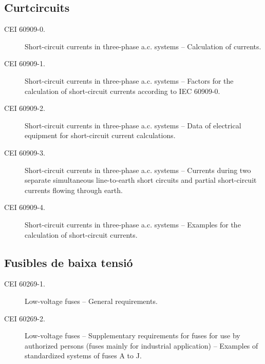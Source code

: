 \subsection*{Curtcircuits}
\begin{description}
    \item [\hspace{5mm}CEI 60909-0.] Short-circuit currents in three-phase a.c. systems -- Calculation of currents.
    \item [\hspace{5mm}CEI 60909-1.] Short-circuit currents in three-phase a.c. systems --  Factors for the calculation of short-circuit currents according to IEC 60909-0.
    \item [\hspace{5mm}CEI 60909-2.] Short-circuit currents in three-phase a.c. systems --  Data of electrical equipment for short-circuit current calculations.
    \item [\hspace{5mm}CEI 60909-3.] Short-circuit currents in three-phase a.c. systems -- Currents during two separate simultaneous line-to-earth short circuits and partial short-circuit currents flowing through earth.
    \item [\hspace{5mm}CEI 60909-4.] Short-circuit currents in three-phase a.c. systems -- Examples for the calculation of short-circuit currents.
\end{description}

\subsection*{Fusibles de baixa tensió}
\begin{description}
    \item [\hspace{5mm}CEI 60269-1.] Low-voltage fuses -- General requirements.
    \item [\hspace{5mm}CEI 60269-2.] Low-voltage fuses -- Supplementary requirements for fuses for use by authorized persons
          (fuses mainly for industrial application) -- Examples of standardized systems of fuses A to J.
\end{description}

